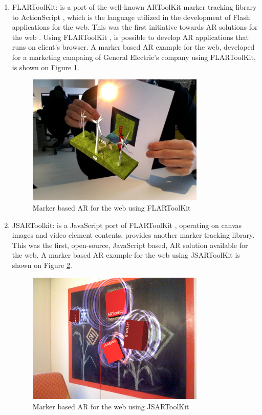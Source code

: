 \begin{enumerate}
    \item FLARToolKit: is a port of the well-known ARToolKit \cite{Hirokazu2002} marker tracking library to ActionScript \cite{Flash2013}, which is the language utilized in the development of Flash \cite{Flash2013} applications for the web. This was the first initiative towards AR solutions for the web \cite{Pablo2013}. Using FLARToolKit \cite{Yan2011}, is possible to develop AR applications that runs on client's browser. A marker based AR example for the web, developed for a marketing campaing of General Electric's company using FLARToolKit, is shown on Figure \ref{figure:flartoolkit}.

    \begin{figure}[!htb]
      \centering
      \includegraphics[width=240pt]{chapters/computer_vision_library_for_the_web/flartoolkit.png}
      \caption{Marker based AR for the web using FLARToolKit}
      \label{figure:flartoolkit}
    \end{figure}

    \item JSARToolkit: is a JavaScript \cite{International2009} port of FLARToolKit \cite{Yan2011}, operating on canvas images \cite{Canvas2013} and
video element \cite{Hickson2013} contents, provides another marker tracking library. This was the first, open-source, JavaScript \cite{International2009} based, AR solution available for the web. A marker based AR example for the web using JSARToolKit is shown on Figure \ref{figure:jsartoolkit}.

    \begin{figure}[!htb]
      \centering
      \includegraphics[width=240pt]{chapters/computer_vision_library_for_the_web/jsartoolkit.png}
      \caption{Marker based AR for the web using JSARToolKit}
      \label{figure:jsartoolkit}
    \end{figure}


\end{enumerate}
